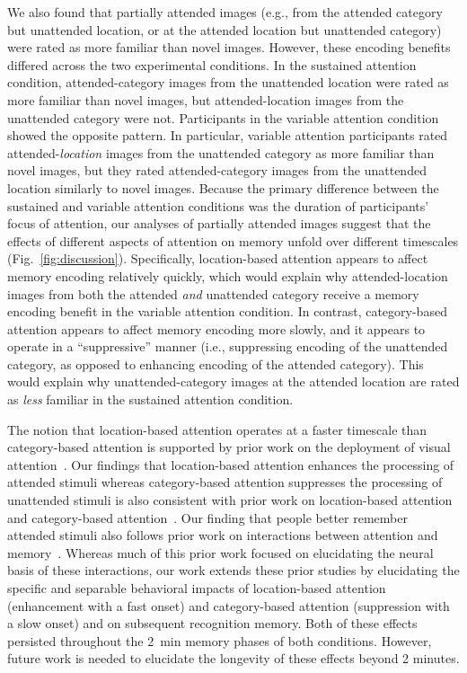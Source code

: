\documentclass[english]{article}
\begin{document}
We also found that partially attended images (e.g., from the attended category
but unattended location, or at the attended location but unattended category)
were rated as more familiar than novel images. However, these encoding benefits
differed across the two experimental conditions. In the sustained attention
condition, attended-category images from the unattended location were rated as
more familiar than novel images, but attended-location images from the
unattended category were not. Participants in the variable attention condition
showed the opposite pattern. In particular, variable attention participants
rated attended-\textit{location} images from the unattended category as more
familiar than novel images, but they rated attended-category images from the
unattended location similarly to novel images. Because the primary difference
between the sustained and variable attention conditions was the duration of
participants' focus of attention, our analyses of partially attended images
suggest that the effects of different aspects of attention on memory unfold
over different timescales (Fig.~\ref{fig:discussion}). Specifically,
location-based attention appears to affect memory encoding relatively quickly,
which would explain why attended-location images from both the attended
\textit{and} unattended category receive a memory encoding benefit in the
variable attention condition. In contrast, category-based attention appears to
affect memory encoding more slowly, and it appears to operate in a
``suppressive'' manner (i.e., suppressing encoding of the unattended category,
as opposed to enhancing encoding of the attended category). This would explain
why unattended-category images at the attended location are rated as
\textit{less} familiar in the sustained attention condition.



The notion that location-based attention operates at a faster timescale than
category-based attention is supported by prior work on the deployment of visual
attention~\citep{SotoBlan04, StopEtal07}. Our findings that location-based
attention enhances the processing of attended stimuli whereas category-based
attention suppresses the processing of unattended stimuli is also consistent
with prior work on location-based attention~\citep[e.g.,][]{IttiKoch01} and
category-based attention~\citep[e.g.,][]{MoheEtal14}. Our finding that people
better remember attended stimuli also follows prior work on interactions
between attention and memory~\citep{PallWagn02, ChunTurk07, AlyTurk16,
AlyTurk17, WittEtal18, MorrEtal14, BaleEtal21, UncaEtal11, TurkEtal13,
LaRoEtal15}. Whereas much of this prior work focused on elucidating the neural
basis of these interactions, our work extends these prior studies by
elucidating the specific and separable behavioral impacts of location-based
attention (enhancement with a fast onset) and category-based attention
(suppression with a slow onset) and on subsequent recognition memory. Both of
these effects persisted throughout the 2~min memory phases of both conditions.
However, future work is needed to elucidate the longevity of these effects
beyond 2 minutes.
\end{document}

